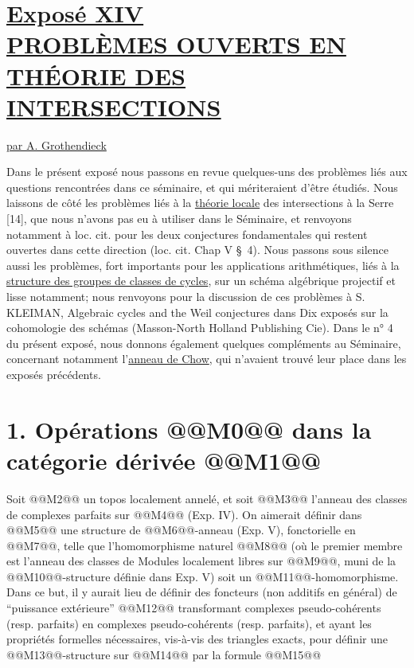 
\section*{\underline{Exposé XIV}\\[3pt] \underline{\underline{PROBLÈMES OUVERTS EN THÉORIE DES INTERSECTIONS}}}
\begin{center}
\underline{par A. Grothendieck}
\end{center}

Dans le présent exposé nous passons en revue quelques-uns des problèmes liés aux questions rencontrées dans ce séminaire, et qui mériteraient d'être étudiés. Nous laissons de côté les problèmes liés à la \uline{théorie locale} des intersections à la Serre [14], que nous n'avons pas eu à utiliser dans le Séminaire, et renvoyons notamment à loc. cit. pour les deux conjectures fondamentales qui restent ouvertes dans cette direction (loc. cit. Chap V \S~4). Nous passons sous silence aussi les problèmes, fort importants pour les applications arithmétiques, liés à la \uline{structure des groupes de classes de cycles}, sur un schéma algébrique projectif et lisse notamment; nous renvoyons pour la discussion de ces problèmes à S. KLEIMAN, Algebraic cycles and the Weil conjectures dans Dix exposés sur la cohomologie des schémas (Masson-North Holland Publishing Cie). Dans le n° 4 du présent exposé, nous donnons également quelques compléments au Séminaire, concernant notamment l'\uline{anneau de Chow}, qui n'avaient trouvé leur place dans les exposés précédents.

\section*{1. Opérations @@M0@@ dans la catégorie dérivée @@M1@@\SGAAuthorFootMark{*}}

Soit @@M2@@ un topos localement annelé, et soit @@M3@@ l'anneau des classes de complexes parfaits sur @@M4@@ (Exp. IV). On aimerait définir dans @@M5@@ une structure de @@M6@@-anneau (Exp. V), fonctorielle en @@M7@@, telle que l'homomorphisme naturel
@@M8@@
(où le premier membre est l'anneau des classes de Modules localement libres sur @@M9@@, muni de la @@M10@@-structure définie dans Exp. V) soit un @@M11@@-homomorphisme. Dans ce but, il y aurait lieu de définir des foncteurs (non additifs en général) de ``puissance extérieure''
@@M12@@
transformant complexes pseudo-cohérents (resp. parfaits) en complexes pseudo-cohérents (resp. parfaits), et ayant les propriétés formelles nécessaires, vis-à-vis des triangles exacts, pour définir une @@M13@@-structure sur @@M14@@ par la formule
@@M15@@

